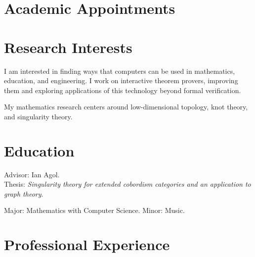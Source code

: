 \documentclass[11pt,letterpaper,roman]{moderncv}
\begin{document}
\maketitle
\vspace{-2em}

\section{Academic Appointments}




\section{Research Interests}

I am interested in finding ways that computers can be used in mathematics, education, and engineering.
I work on interactive theorem provers, improving them and exploring applications of this technology beyond formal verification.

\vspace{0.5em}
My mathematics research centers around low-dimensional topology, knot theory, and singularity theory.


\section{Education}

{Advisor: Ian Agol.\\
Thesis: \emph{Singularity theory for extended cobordism categories and an application to graph theory}.}

{Major: Mathematics with Computer Science. Minor: Music.}

\section{Professional Experience}

\end{document}
